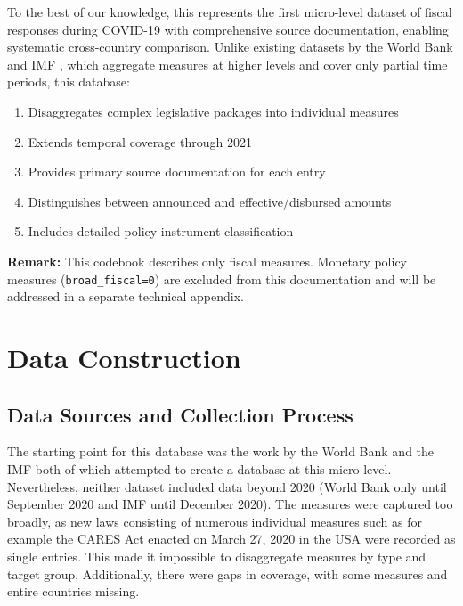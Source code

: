 \documentclass[12pt]{article}
\begin{document}
To the best of our knowledge, this represents the first micro-level dataset of fiscal responses during COVID-19 with comprehensive source documentation, enabling systematic cross-country comparison. Unlike existing datasets by the World Bank \citep{LaceyMassadUtz2021} and IMF \citep{Mishra2022Tracking}, which aggregate measures at higher levels and cover only partial time periods, this database:

\begin{enumerate}
\item Disaggregates complex legislative packages into individual measures
\item Extends temporal coverage through 2021
\item Provides primary source documentation for each entry
\item Distinguishes between announced and effective/disbursed amounts
\item Includes detailed policy instrument classification
\end{enumerate}


\textbf{Remark:} This codebook describes only fiscal measures. Monetary policy measures (\texttt{broad\_fiscal=0}) are excluded from this documentation and will be addressed in a separate technical appendix.

\newpage
\section{Data Construction}

\subsection{Data Sources and Collection Process}

The starting point for this database was the work by the World Bank \citep{LaceyMassadUtz2021} and the IMF \citep{Mishra2022Tracking} both of which attempted to create a database at this micro-level. Nevertheless, neither dataset included data beyond 2020 (World Bank only until September 2020 and IMF until December 2020). The measures were captured too broadly, as new laws consisting of numerous individual measures such as for example the CARES Act enacted on March 27, 2020 in the USA were recorded as single entries. This made it impossible to disaggregate measures by type and target group. Additionally, there were gaps in coverage, with some measures and entire countries missing.
\vspace{3mm}
\end{document}
